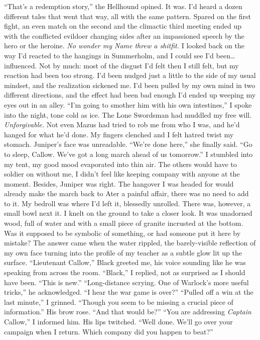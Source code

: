 \documentclass[12pt, openany]{book}
\begin{document}
“That’s a redemption story,” the Hellhound opined.
It was. I’d heard a dozen different tales that went that way, all with the same pattern. Spared on the first fight, an even match on the second and the climactic third meeting ended up with the conflicted evildoer changing sides after an impassioned speech by the hero or the heroine. \textit{No wonder my Name threw a shitfit.} I looked back on the way I’d reacted to the hangings in Summerholm, and I could see I’d been… influenced. Not by much: most of the disgust I’d felt then I still felt, but my reaction had been too strong. I’d been nudged just a little to the side of my usual mindset, and the realization sickened me. I’d been pulled by my own mind in two different directions, and the effect had been bad enough I’d ended up weeping my eyes out in an alley.
“I’m going to smother him with his own intestines,” I spoke into the night, tone cold as ice.
The Lone Swordsman had muddled my free will. \textit{Unforgivable.} Not even Mazus had tried to rob me from who I was, and he’d hanged for what he’d done. My fingers clenched and I felt hatred twist my stomach. Juniper’s face was unreadable.
“We’re done here,” she finally said. “Go to sleep, Callow. We’ve got a long march ahead of us tomorrow.”
I stumbled into my tent, my good mood evaporated into thin air. The others would have to soldier on without me, I didn’t feel like keeping company with anyone at the moment. Besides, Juniper was right. The hangover I was headed for would already make the march back to Ater a painful affair, there was no need to add to it. My bedroll was where I’d left it, blessedly unrolled. There was, however, a small bowl next it. I knelt on the ground to take a closer look. It was unadorned wood, full of water and with a small piece of granite incrusted at the bottom. Was it supposed to be symbolic of something, or had someone put it here by mistake? The answer came when the water rippled, the barely-visible reflection of my own face turning into the profile of my teacher as a subtle glow lit up the surface.
“Lieutenant Callow,” Black greeted me, his voice sounding like he was speaking from across the room.
“Black,” I replied, not as surprised as I should have been. “This is new.”
“Long-distance scrying. One of Warlock’s more useful tricks,” he acknowledged. “I hear the war game is over?”
“Pulled off a win at the last minute,” I grinned. “Though you seem to be missing a crucial piece of information.”
His brow rose. “And that would be?”
“You are addressing \textit{Captain} Callow,” I informed him.
His lips twitched. “Well done. We’ll go over your campaign when I return. Which company did you happen to beat?”
\end{document}
